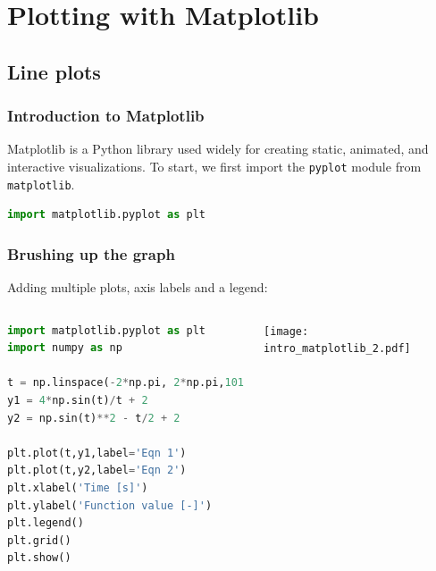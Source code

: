 

\section{Plotting with Matplotlib}
\subsection{Line plots}

\begin{frame}[fragile]
  \frametitle{Introduction to Matplotlib}
  Matplotlib is a Python library used widely for creating static, animated, and interactive visualizations. To start, we first import the \lstinline{pyplot} module from \lstinline{matplotlib}.\pause
  
  \begin{lstlisting}[language=Python]
import matplotlib.pyplot as plt
  \end{lstlisting}\pause
  
\end{frame}

\begin{frame}[fragile]
  \frametitle{Brushing up the graph}
  Adding multiple plots, axis labels and a legend:
  \begin{columns}
    \begin{lstlisting}[language=Python]
import matplotlib.pyplot as plt
import numpy as np

t = np.linspace(-2*np.pi, 2*np.pi,101)
y1 = 4*np.sin(t)/t + 2
y2 = np.sin(t)**2 - t/2 + 2

plt.plot(t,y1,label='Eqn 1')
plt.plot(t,y2,label='Eqn 2')
plt.xlabel('Time [s]')
plt.ylabel('Function value [-]')
plt.legend()
plt.grid()
plt.show()
    \end{lstlisting}\pause
      \texttt{[image: intro\_matplotlib\_2.pdf]}
  \end{columns}
\end{frame}

